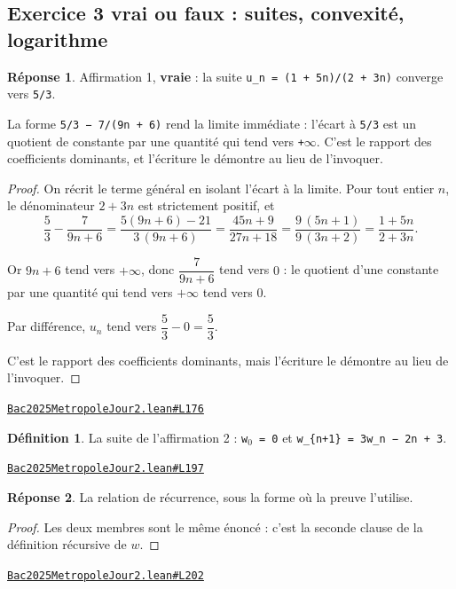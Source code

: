 \documentclass[11pt,a4paper]{article}
\theoremstyle{definition}
\newtheorem{definition}{Définition}
\theoremstyle{plain}
\theoremstyle{definition}
\newtheorem*{reponse}{Réponse}
\newcommand{\source}[2]{\par\smallskip\noindent\hfill{\footnotesize\href{#1}{\texttt{#2}}}\par\smallskip}
\begin{document}
\subsection{Exercice 3 \textemdash{} vrai ou faux : suites, convexité, logarithme}

\begin{reponse}
Affirmation 1, \textbf{vraie} : la suite \texttt{u\_n = (1 + 5n)/(2 + 3n)} converge vers \texttt{5/3}.

La forme \texttt{5/3 − 7/(9n + 6)} rend la limite immédiate : l'écart à \texttt{5/3} est un quotient
de constante par une quantité qui tend vers \texttt{+\(\infty\)}. C'est le rapport des coefficients
dominants, et l'écriture le démontre au lieu de l'invoquer.
\end{reponse}
\begin{proof}
On récrit le terme général en isolant l'écart à la limite. Pour tout entier $n$, le
dénominateur $2 + 3n$ est strictement positif, et
\[ \frac{5}{3} - \frac{7}{9n + 6}
  = \frac{5(9n + 6) - 21}{3\,(9n + 6)}
  = \frac{45n + 9}{27n + 18}
  = \frac{9\,(5n + 1)}{9\,(3n + 2)}
  = \frac{1 + 5n}{2 + 3n} . \]

Or $9n + 6$ tend vers $+\infty$, donc $\dfrac{7}{9n + 6}$ tend vers $0$ : le quotient
d'une constante par une quantité qui tend vers $+\infty$ tend vers $0$.

Par différence, $u_n$ tend vers $\dfrac{5}{3} - 0 = \dfrac{5}{3}$.

C'est le rapport des coefficients dominants, mais l'écriture le démontre au lieu de
l'invoquer.
\end{proof}
\source{https://github.com/Commutator-IO/learn-lean/blob/main/exams/2025/Bac2025MetropoleJour2.lean\#L176}{Bac2025MetropoleJour2.lean\#L176}

\begin{definition}
La suite de l'affirmation 2 : \texttt{w\(_{0}\) = 0} et \texttt{w\_\{n+1\} = 3w\_n − 2n + 3}.
\end{definition}
\source{https://github.com/Commutator-IO/learn-lean/blob/main/exams/2025/Bac2025MetropoleJour2.lean\#L197}{Bac2025MetropoleJour2.lean\#L197}

\begin{reponse}
La relation de récurrence, sous la forme où la preuve l'utilise.
\end{reponse}
\begin{proof}
Les deux membres sont le même énoncé : c'est la seconde clause de la définition récursive
de $w$.
\end{proof}
\source{https://github.com/Commutator-IO/learn-lean/blob/main/exams/2025/Bac2025MetropoleJour2.lean\#L202}{Bac2025MetropoleJour2.lean\#L202}
\end{document}
